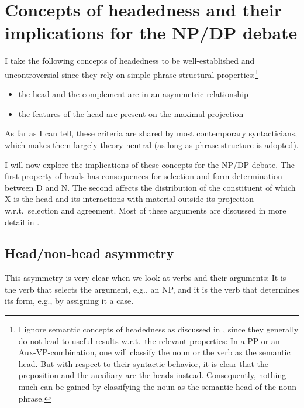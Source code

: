 \documentclass[output=paper,colorlinks,citecolor=black,
]{langscibook}
\begin{document}
\section{Concepts of headedness and their implications for the NP/DP debate}
\label{sec-headedness}

I take the following concepts of headedness to be well-established and uncontroversial since they rely on simple phrase-structural properties:\footnote{I ignore semantic concepts of headedness as discussed in \citet{Zwicky:1985:heads}, since they generally do not lead to useful results w.r.t.\ the relevant properties: In a PP or an Aux-VP-combination, one will classify the noun or the verb as the semantic head. But with respect to their syntactic behavior, it is clear that the preposition and the auxiliary are the heads instead. Consequently, nothing much can be gained by classifying the noun as the semantic head of the noun phrase.}

\begin{itemize}
	\item the head and the complement are in an asymmetric relationship %
	
	\item the features of the head are present on the maximal projection 
\end{itemize}%

\noindent
As far as I can tell, these criteria are shared by most contemporary syntacticians, which makes them largely theory-neutral (as long as phrase-structure is adopted).

I will now explore the implications of these concepts for the NP/DP debate. The first property of heads has consequences for selection and form determination between D and N. The second affects the distribution of the constituent of which X is the head and its interactions with material outside its projection w.r.t.\ selection and agreement. Most of these arguments are discussed in more detail in \citet{Salzmann:2020:NP-DP}.

\subsection{Head/non-head asymmetry}

This asymmetry is very clear when we look at verbs and their arguments: It is the verb that selects the argument, e.g., an NP, and it is the verb that determines its form, e.g., by assigning it a case.
\end{document}
